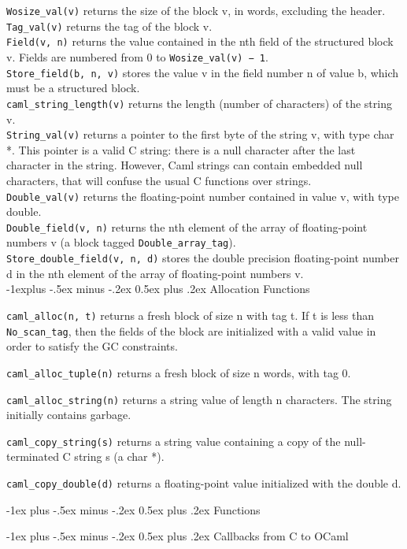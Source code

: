 \documentclass[10pt,landscape]{article}
\makeatletter
\renewcommand{\section}{\@startsection{section}{1}{0mm}%
        {-1ex plus -.5ex minus -.2ex}%
        {0.5ex plus .2ex}%
        {\normalfont\large\bfseries}}
\renewcommand{\subsection}{\@startsection{subsection}{2}{0mm}%
        {-1explus -.5ex minus -.2ex}%
        {0.5ex plus .2ex}%
        {\normalfont\normalsize\bfseries}}
\makeatother
\begin{document}
\begin{multicols}{3}
\verb!Wosize_val(v)! returns the size of the block v, in words, excluding the header.\\
\verb!Tag_val(v)! returns the tag of the block v.\\
\verb!Field(v, n)! returns the value contained in the nth field of the structured block v. Fields are numbered from 0 to \verb!Wosize_val(v) − 1!.\\
\verb!Store_field(b, n, v)! stores the value v in the field number n of value b, which must be a structured block.\\
\verb!caml_string_length(v)! returns the length (number of characters) of the string v. \\
\verb!String_val(v)! returns a pointer to the first byte of the string
v, with type char *. This pointer is a valid C string: there is a null
character after the last character in the string.  However, Caml
strings can contain embedded null characters, that will confuse the
usual C functions over strings.\\
\verb!Double_val(v)! returns the floating-point number contained in
value v, with type double.\\
\verb!Double_field(v, n)! returns the nth element of the array of
floating-point numbers v (a block tagged \verb!Double_array_tag!).\\
\verb!Store_double_field(v, n, d)! stores the double precision
floating-point number d in the nth element of the array of
floating-point numbers v. \\

\subsection{Allocation Functions}

\verb!caml_alloc(n, t)! returns a fresh block of size n with tag t. If t is less than \verb!No_scan_tag!, then
the fields of the block are initialized with a valid value in order to satisfy the GC constraints.

\verb!caml_alloc_tuple(n)! returns a fresh block of size n words, with tag 0.

\verb!caml_alloc_string(n)! returns a string value of length n
characters. The string initially contains garbage.

\verb!caml_copy_string(s)! returns a string value containing a copy of
the null-terminated C string s (a char *).

\verb!caml_copy_double(d)! returns a floating-point value initialized
with the double d.


\section{Functions}

\section{Callbacks from C to OCaml}

\end{multicols}
\end{document}
